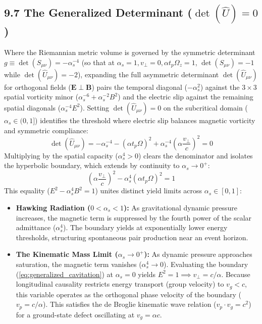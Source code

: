 \subsection*{9.7 The Generalized Determinant ($\det(\hat{U}) = 0$)}
Where the Riemannian metric volume is governed by the symmetric determinant $g \equiv \det(S_{\mu\nu}) = -\alpha_s^{-4}$ (so that at $\alpha_s = 1, v_\perp = 0, \alpha t_p \Omega_z = 1$, $\det(S_{\mu\nu}) = -1$ while $\det(\hat{U}_{\mu\nu}) = -2$), expanding the full asymmetric determinant $\det(\hat{U}_{\mu\nu})$ for orthogonal fields ($\mathbf{E} \perp \mathbf{B}$) pairs the temporal diagonal ($-\alpha_s^2$) against the $3\times 3$ spatial vorticity minor ($\alpha_s^{-6} + \alpha_s^{-2}B^2$) and the electric slip against the remaining spatial diagonals ($\alpha_s^{-4}E^2$). Setting $\det(\hat{U}_{\mu\nu}) = 0$ on the subcritical domain ($\alpha_s \in (0, 1]$) identifies the threshold where electric slip balances magnetic vorticity and symmetric compliance:
\begin{equation} 
    \det(\hat{U}_{\mu\nu}) = -\alpha_s^{-4} - (\alpha t_p \Omega)^2 + \alpha_s^{-4} \left(\alpha \frac{v_\perp}{c}\right)^2 = 0 
\end{equation}
Multiplying by the spatial capacity ($\alpha_s^4 > 0$) clears the denominator and isolates the hyperbolic boundary, which extends by continuity to $\alpha_s \to 0^+$: 
\begin{equation} 
    \left(\alpha \frac{v_\perp}{c}\right)^2 - \alpha_s^4 (\alpha t_p \Omega)^2 = 1 \label{eq:generalized_cavitation} 
\end{equation} 
This equality ($E^2 - \alpha_s^4 B^2 = 1$) unites distinct yield limits across $\alpha_s \in [0, 1]$: 
\begin{itemize} 
     \item \textbf{Hawking Radiation ($0 < \alpha_s < 1$):} As gravitational dynamic pressure increases, the magnetic term is suppressed by the fourth power of the scalar admittance ($\alpha_s^4$). The boundary yields at exponentially lower energy thresholds, structuring spontaneous pair production near an event horizon. 
    \item \textbf{The Kinematic Mass Limit ($\alpha_s \to 0^+$):} As dynamic pressure approaches saturation, the magnetic term vanishes ($\alpha_s^4 \to 0$). Evaluating the boundary (\ref{eq:generalized_cavitation}) at $\alpha_s = 0$ yields $E^2 = 1 \implies v_\perp = c/\alpha$. Because longitudinal causality restricts energy transport (group velocity) to $v_g < c$, this variable operates as the orthogonal phase velocity of the boundary ($v_p = c/\alpha$). This satisfies the de Broglie kinematic wave relation ($v_p \cdot v_g = c^2$) for a ground-state defect oscillating at $v_g = \alpha c$.
\end{itemize}

